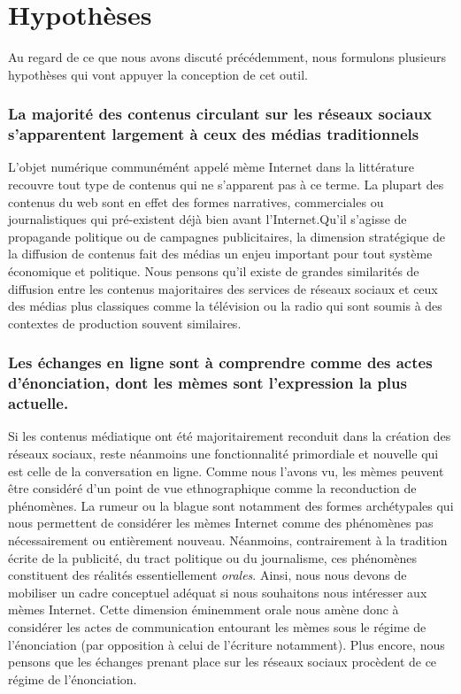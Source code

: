 \section{Hypothèses}
\label{sec:hypotheses}

Au regard de ce que nous avons discuté précédemment, nous formulons plusieurs hypothèses qui  vont appuyer la conception de cet outil.

\subsubsection{La majorité des contenus circulant sur les réseaux sociaux s'apparentent largement à ceux des médias traditionnels} 

L'objet numérique communémént appelé mème Internet dans la littérature recouvre tout type de contenus qui ne s'apparent pas à ce terme. La plupart des contenus du web sont en effet des formes narratives, commerciales ou journalistiques qui pré-existent déjà bien avant l'Internet.Qu{\textquoteright}il s{\textquoteright}agisse de propagande politique ou de campagnes publicitaires, la dimension stratégique de la diffusion de contenus fait des médias un enjeu important pour tout système économique et politique. Nous pensons qu{\textquoteright}il existe de grandes similarités de diffusion entre les contenus majoritaires des services de réseaux sociaux et ceux des médias plus classiques comme la télévision ou la radio qui sont soumis à des contextes de production souvent similaires.

\subsubsection{Les échanges en ligne sont à comprendre comme des actes d'énonciation, dont les mèmes sont l'expression la plus actuelle.}

Si les contenus médiatique ont été majoritairement reconduit dans la création des réseaux sociaux, reste néanmoins une fonctionnalité primordiale et nouvelle qui est celle de la conversation en ligne. Comme nous l'avons vu, les mèmes peuvent être considéré d'un point de vue ethnographique comme la reconduction de phénomènes. La rumeur ou la blague sont notamment des formes archétypales qui nous permettent de considérer les mèmes Internet comme des phénomènes pas nécessairement ou entièrement nouveau. Néanmoins, contrairement à la tradition écrite de la publicité, du tract politique ou du journalisme, ces phénomènes constituent des réalités essentiellement \textit{orales}. Ainsi, nous nous devons de mobiliser un cadre conceptuel adéquat si nous souhaitons nous intéresser aux mèmes Internet. Cette dimension éminemment orale nous amène donc à considérer les actes de communication entourant les mèmes sous le régime de l'énonciation (par opposition à celui de l'écriture notamment). Plus encore, nous pensons que les échanges prenant place sur les réseaux sociaux procèdent de ce régime de l'énonciation.


